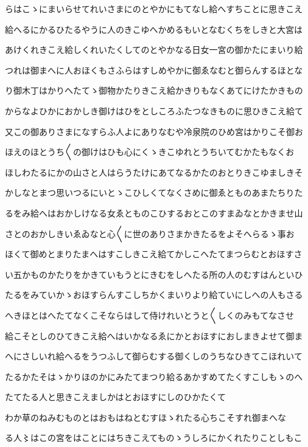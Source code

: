 \documentclass[a4paper,11pt,landscape]{ltjtarticle}
\begin{document}
らはこゝにまいらせてれいさまにのとやかにもてなし給へすちことに思きこえ
\par\medskip
給へるにかるひたるやうに人のきこゆへかめるもいとなむくちをしきと大宮は
\par\medskip
あけくれきこえ給しくれいたくしてのとやかなる日女一宮の御かたにまいり給
\par\medskip
つれは御まへに人おほくもさふらはすしめやかに御ゑなむと御らんするほとな
\par\medskip
り御木丁はかりへたてゝ御物かたりきこえ給かきりもなくあてにけたかきもの
\par\medskip
からなよひかにおかしき御けはひをとしころふたつなきものに思ひきこえ給て
\par\medskip
又この御ありさまになすらふ人よにありなむや冷泉院のひめ宮はかりこそ御お
\par\medskip
ほえのほとうち〱の御けはひも心にくゝきこゆれとうちいてむかたもなくお
\par\medskip
ほしわたるにかの山さと人はらうたけにあてなるかたのおとりきこゆましきそ
\par\medskip
かしなとまつ思いつるにいとゝこひしくてなくさめに御ゑとものあまたちりた
\par\medskip
るをみ給へはおかしけなる女ゑとものこひするおとこのすまゐなとかきませ山
\par\medskip
さとのおかしきいゑゐなと心〱に世のありさまかきたるをよそへらるゝ事お
\par\medskip
ほくて御めとまりたまへはすこしきこえ給てかしこへたてまつらむとおほすさ
\par\medskip
い五かものかたりをかきていもうとにきむをしへたる所の人のむすはんといひ
\par\medskip
たるをみていかゝおほすらんすこしちかくまいりより給ていにしへの人もさる
\par\medskip
へきほとはへたてなくこそならはして侍けれいとうと〱しくのみもてなさせ
\par\medskip
給こそとしのひてきこえ給へはいかなるゑにかとおほすにおしまきよせて御ま
\par\medskip
へにさしいれ給へるをうつふして御らむする御くしのうちなひきてこほれいて
\par\medskip
たるかたそはゝかりほのかにみたてまつり給るあかすめてたくすこしもゝのへ
\par\medskip
たてたる人と思きこえましかはとおほすにしのひかたくて
\par\medskip
わか草のねみむものとはおもはねとむすほゝれたる心ちこそすれ御まへな
\par\medskip
る人〻はこの宮をはことにはちきこえてものゝうしろにかくれたりことしもこ
\end{document}

